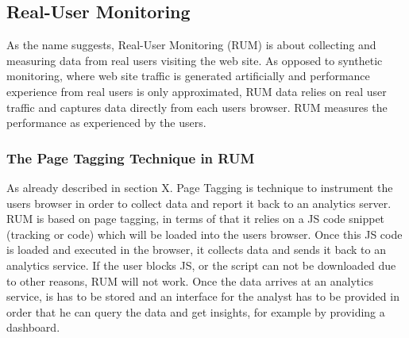 






\subsection{Real-User Monitoring}



As the name suggests, Real-User Monitoring (RUM) is about collecting and measuring data from real users visiting the web site.
As opposed to synthetic monitoring, where web site traffic is generated artificially and performance experience from real users is only approximated, RUM data relies on real user traffic and captures data directly from each users browser. 
RUM measures the performance as experienced by the users. %




\subsubsection{The Page Tagging Technique in RUM}


As already described in section X. Page Tagging is technique to instrument the users browser in order to collect data and report it back to an analytics server.
RUM is based on page tagging, in terms of that it relies on a JS code snippet (tracking or code) which will be loaded into the users browser.
Once this JS code is loaded and executed in the browser, it collects data and sends it back to an analytics service.
If the user blocks JS, or the script can not be downloaded due to other reasons,  RUM will not work.
Once the data arrives at an analytics service, is has to be stored and an interface for the analyst has to be provided in order that he can query the data and get insights, for example by providing a dashboard. %

